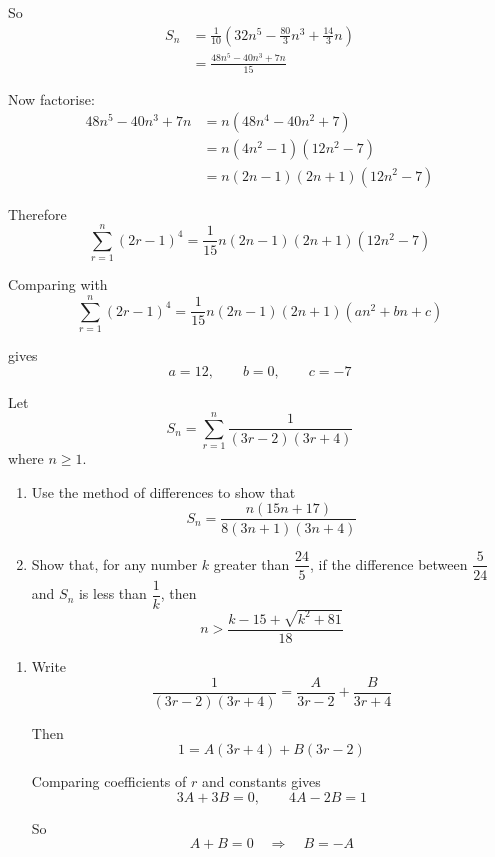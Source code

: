 \documentclass[leqno]{article}
\begin{document}
\begin{enumerate}[
  label=\textbf{\arabic*.},
  leftmargin=*,
  topsep=0pt,
  partopsep=0pt,
  parsep=0pt
]
\begin{djsSolution}
\begin{enumerate}[label=\textbf{(\alph*)}]
So
\begin{align*}
S_n
&=\frac{1}{10}\left(32n^5-\frac{80}{3}n^3+\frac{14}{3}n\right)\\
&=\frac{48n^5-40n^3+7n}{15}
\end{align*}

Now factorise:
\begin{align*}
48n^5-40n^3+7n
&=n(48n^4-40n^2+7)\\
&=n(4n^2-1)(12n^2-7)\\
&=n(2n-1)(2n+1)(12n^2-7)
\end{align*}

Therefore
\[
\sum_{r=1}^{n}(2r-1)^4=\frac{1}{15}n(2n-1)(2n+1)(12n^2-7)
\]

Comparing with
\[
\sum_{r=1}^{n}(2r-1)^4=\frac{1}{15}n(2n-1)(2n+1)(an^2+bn+c)
\]

gives
\[
a=12,\qquad b=0,\qquad c=-7
\]
\end{enumerate}
\end{djsSolution}


\newpage

\questionitem

Let
\[
S_n = \sum_{r=1}^{n} \frac{1}{(3r-2)(3r+4)}
\]
where $n \geq 1$. \\

\begin{enumerate}[label=\textbf{(\alph*)}]
  \item Use the method of differences to show that
  \[
  S_n = \frac{n(15n+17)}{8(3n+1)(3n+4)}
  \]
  \item Show that, for any number $k$ greater than $\dfrac{24}{5}$, if the difference between $\dfrac{5}{24}$ and $S_n$ is less than $\dfrac{1}{k}$, then
  \[
  n > \frac{k - 15 + \sqrt{k^2 + 81}}{18}
  \]
\end{enumerate}

\vspace*{10pt}

\begin{djsSolution}
\begin{enumerate}[label=\textbf{(\alph*)}]
  \item Write
\[
\frac{1}{(3r-2)(3r+4)}=\frac{A}{3r-2}+\frac{B}{3r+4}
\]

Then
\[
1=A(3r+4)+B(3r-2)
\]

Comparing coefficients of \(r\) and constants gives
\[
3A+3B=0,\qquad 4A-2B=1
\]

So
\[
A+B=0\quad\Longrightarrow\quad B=-A
\]


\end{enumerate}
\end{djsSolution}
\end{enumerate}
\end{document}

